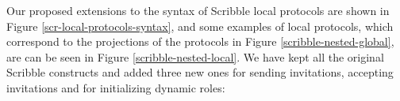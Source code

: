 \documentclass[12pt,twoside]{report}
\newcommand{\white}{\ \ \ \ \ \ \ \ \ \ \ \ }
\begin{document}
            


Our proposed extensions to the syntax of Scribble local protocols are shown in Figure \ref{scr-local-protocols-syntax}, and some examples of local protocols, which correspond to the projections of the protocols in Figure \ref{scribble-nested-global}, are can be seen in Figure \ref{scribble-nested-local}. We have kept all the original Scribble constructs and added three new ones for sending invitations, accepting invitations and for initializing dynamic roles:
\end{document}
